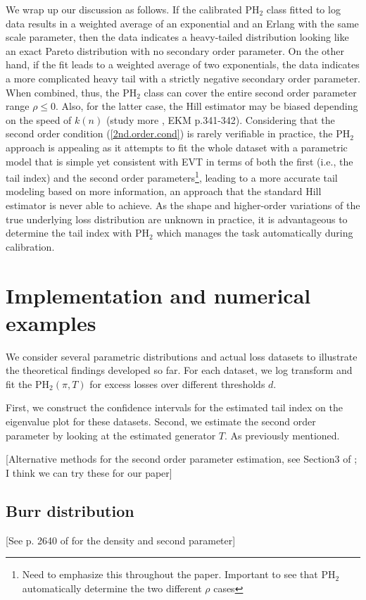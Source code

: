 \documentclass[11pt]{article}
\begin{document}
We wrap up our discussion as follows. If the calibrated PH$_2$ class fitted to log data results in a weighted average of an exponential and an Erlang with the same scale parameter, then the data indicates a heavy-tailed distribution looking like an exact Pareto distribution with no secondary order parameter. On the other hand, if the fit leads to  a weighted average of two exponentials, the data indicates a more complicated heavy tail with a strictly negative secondary order parameter. When combined, thus, the PH$_2$ class can cover the entire second order parameter range $\rho \le 0$. Also, for the latter case, the Hill estimator may be biased depending on the speed of $k(n)$ (study more , EKM p.341-342). Considering that the second order condition (\ref{2nd.order.cond}) is rarely verifiable in practice, the PH$_2$ approach is appealing as it attempts to fit the whole dataset with a parametric model that is simple yet consistent with EVT in terms of both the first (i.e., the tail index) and the second order parameters\footnote{Need to emphasize this throughout the paper. Important to see that PH$_2$ automatically determine the two different $\rho$ cases}, leading to a more accurate tail modeling based on more information, an approach  that the standard Hill estimator is never able to achieve. As the shape and higher-order variations of  the true underlying loss distribution are unknown in practice, it is advantageous to determine the tail index with PH$_2$ which manages the task automatically during calibration.

\section{Implementation and numerical examples}
We consider several parametric distributions and actual loss datasets to illustrate the theoretical findings developed so far. For each dataset, we log transform and fit the PH$_2 (\pi, T)$ for excess losses over different thresholds $d$.

First, we construct the confidence intervals for the estimated tail index on the eigenvalue plot for these datasets. Second, we estimate the second order parameter by looking at the estimated generator $T$. As previously mentioned.

[Alternative methods for the second order parameter estimation, see Section3 of \cite{Goege+Beirl+etal:10a}; I think we can try these for our paper]
\subsection{Burr distribution}
[See p. 2640 of \cite{Goege+Beirl+etal:10a} for the density and second parameter]
\end{document}
